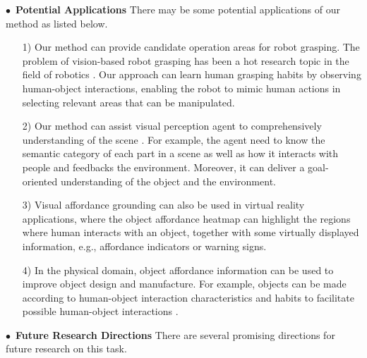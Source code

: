 \documentclass[journal,twoside]{IEEEtran}
\newcommand{\myPara}[1]{\vspace{5pt}\noindent$\bullet$~\textbf{#1} \quad}
\begin{document}
\myPara{Potential Applications}
There may be some potential applications of our method as listed below.
\begin{itemize}
    
    \item [1)]
    Our method can provide candidate operation areas for robot grasping. The problem of vision-based robot grasping has been a hot research topic in the field of robotics \cite{du2021vision,fang2020learning,mahler2017dex}. Our approach can learn human grasping habits by observing human-object interactions, enabling the robot to mimic human actions in selecting relevant areas that can be manipulated.
    
    \item [2)]
    Our method can assist visual perception agent to comprehensively understanding of the scene \cite{DBLP:conf/cvpr/ZhuZZ15,Wang_affordanceCVPR2017}. For example, the agent need to know the semantic category of each part in a scene as well as how it interacts with people and feedbacks the environment. Moreover, it can deliver a goal-oriented understanding of the object and the environment.
    
    \item [3)]
    Visual affordance grounding can also be used in virtual reality \cite{fujinawa2017computational} applications, where the object affordance heatmap can highlight the regions where human interacts with an object, together with some virtually displayed information, e.g., affordance indicators or warning signs.
    
    \item[4)]
    In the physical domain, object affordance information can be used to improve object design and manufacture. For example, objects can be made according to human-object interaction characteristics and habits to facilitate possible human-object interactions \cite{zhao2018characterizes}.

\end{itemize}

\myPara{Future Research Directions} There are several promising directions for future research on this task.
\end{document}
